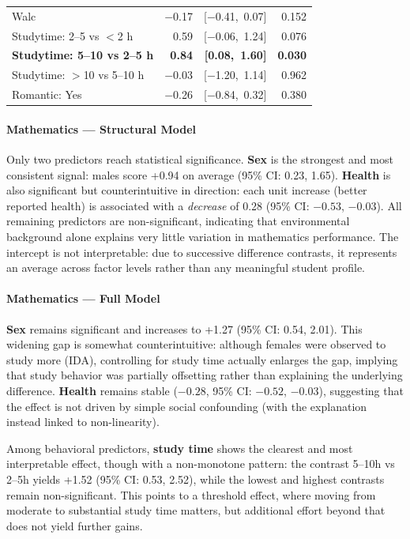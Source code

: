 \documentclass{article}
\begin{document}
\begin{minipage}[t]{0.49\textwidth}
\begin{tabularx}{\textwidth}{Xrrr}
Walc                          & $-$0.17 & [$-$0.41,\ 0.07] & 0.152 \\
Studytime: 2--5 vs $<$2 h     &  0.59 & [$-$0.06,\ 1.24] & 0.076 \\
\textbf{Studytime: 5--10 vs 2--5 h} & \textbf{0.84} & \textbf{[0.08,\ 1.60]} & \textbf{0.030} \\
Studytime: $>$10 vs 5--10 h   & $-$0.03 & [$-$1.20,\ 1.14] & 0.962 \\
Romantic: Yes                 & $-$0.26 & [$-$0.84,\ 0.32] & 0.380 \\
\bottomrule
\end{tabularx}
\end{minipage}


\vspace{-1em}
\paragraph{Mathematics --- Structural Model}

Only two predictors reach statistical significance. \textbf{Sex} is the strongest and most consistent signal: males score +0.94 on average (95\% CI: 0.23, 1.65). \textbf{Health} is also significant but counterintuitive in direction: each unit increase (better reported health) is associated with a \textit{decrease} of 0.28 (95\% CI: $-0.53$, $-0.03$). All remaining predictors are non-significant, indicating that environmental background alone explains very little variation in mathematics performance. The intercept is not interpretable: due to successive difference contrasts, it represents an average across factor levels rather than any meaningful student profile.


\paragraph{Mathematics --- Full Model}

\textbf{Sex} remains significant and increases to +1.27 (95\% CI: 0.54, 2.01). This widening gap is somewhat counterintuitive: although females were observed to study more (IDA), controlling for study time actually enlarges the gap, implying that study behavior was partially offsetting rather than explaining the underlying difference. \textbf{Health} remains stable ($-0.28$, 95\% CI: $-0.52$, $-0.03$), suggesting that the effect is not driven by simple social confounding (with the explanation instead linked to non-linearity).

\vspace{0.2em}
Among behavioral predictors, \textbf{study time} shows the clearest and most interpretable effect, though with a non-monotone pattern: the contrast 5--10h vs 2--5h yields +1.52 (95\% CI: 0.53, 2.52), while the lowest and highest contrasts remain non-significant. This points to a threshold effect, where moving from moderate to substantial study time matters, but additional effort beyond that does not yield further gains.
\end{document}
